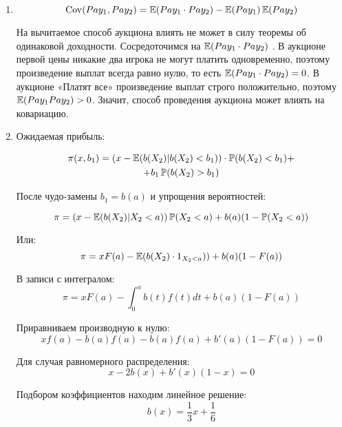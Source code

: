 

\begin{enumerate}
\item

\begin{equation}
\operatorname{Cov}(Pay_{1}, Pay_{2})=\operatorname{\mathbb{E}}(Pay_{1}\cdot Pay_{2})-\operatorname{\mathbb{E}}(Pay_{1})\operatorname{\mathbb{E}}(Pay_{2})
\end{equation}

На вычитаемое способ аукциона влиять не может в силу теоремы об одинаковой доходности. Сосредоточимся на $\operatorname{\mathbb{E}}(Pay_{1}\cdot Pay_{2})$ . В аукционе первой цены никакие два игрока не могут платить одновременно, поэтому произведение выплат всегда равно нулю, то есть $ \operatorname{\mathbb{E}}(Pay_{1}\cdot Pay_{2})=0 $. В аукционе «Платят все» произведение выплат строго положительно, поэтому $ \operatorname{\mathbb{E}}(Pay_{1}Pay_{2})>0 $. Значит, способ проведения аукциона может влиять на ковариацию.



\item  Ожидаемая прибыль:

\begin{multline}
\pi(x,b_{1})=(x-\operatorname{\mathbb{E}}(b(X_{2})|b(X_{2})<b_{1}))\cdot \operatorname{\mathbb{P}}(b(X_{2})<b_{1})+\\
+b_{1}\operatorname{\mathbb{P}}(b(X_{2})>b_{1})
\end{multline}

После чудо-замены $ b_{1}=b(a) $ и упрощения вероятностей:

\begin{equation}
\pi=(x-\operatorname{\mathbb{E}}(b(X_{2})|X_{2}<a))\operatorname{\mathbb{P}}(X_{2}<a)+b(a)(1-\operatorname{\mathbb{P}}(X_{2}<a))
\end{equation}

Или:
\begin{equation}
\pi=xF(a)-\operatorname{\mathbb{E}}(b(X_{2})\cdot 1_{X_{2}<a}))+b(a)(1-F(a))
\end{equation}

В записи с интегралом:
\begin{equation}
\pi=xF(a)-\int_{0}^{a}b(t)f(t)dt+b(a)(1-F(a))
\end{equation}

Приравниваем производную к нулю:
\begin{equation}
xf(a)-b(a)f(a)-b(a)f(a)+b'(a)(1-F(a))=0
\end{equation}

Для случая равномерного распределения:
\begin{equation}
x-2b(x)+b'(x)(1-x)=0
\end{equation}

Подбором коэффициентов находим линейное решение:
\begin{equation}
b(x)=\frac{1}{3}x+\frac{1}{6}
\end{equation}



\end{enumerate}
